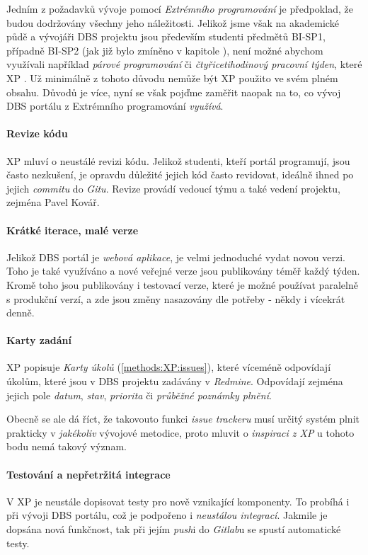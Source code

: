Jedním z požadavků vývoje pomocí \emph{Extrémního programování} je předpoklad, že budou dodržovány všechny jeho náležitosti. Jelikož jsme však na akademické půdě a vývojáři DBS projektu jsou především studenti předmětů BI-SP1, případně BI-SP2 (jak již bylo zmíněno v kapitole ), není možné abychom využívali například \emph{párové programování} či \emph{čtyřicetihodinový pracovní týden}, které XP .
Už minimálně z tohoto důvodu nemůže být XP použito ve svém plném obsahu. Důvodů je více, nyní se však pojďme zaměřit naopak na to, co vývoj DBS portálu z Extrémního programování \emph{využívá}.

\paragraph{Revize kódu}
XP mluví o neustálé revizi kódu. Jelikož studenti, kteří portál programují, jsou často nezkušení, je opravdu důležité jejich kód často revidovat, ideálně ihned po jejich \emph{commitu} do \emph{Gitu}. Revize provádí vedoucí týmu a také vedení projektu, zejména Pavel Kovář.

\paragraph{Krátké iterace, malé verze}
Jelikož DBS portál je \emph{webová aplikace}, je velmi jednoduché vydat novou verzi. Toho je také využíváno a nové veřejné verze jsou publikovány téměř každý týden. Kromě toho jsou publikovány i testovací verze, které je možné používat paralelně s produkční verzí, a zde jsou změny nasazovány dle potřeby - někdy i vícekrát denně.

\paragraph{Karty zadání}
XP popisuje \emph{Karty úkolů} (\ref{methods:XP:issues}), které víceméně odpovídají úkolům, které jsou v DBS projektu zadávány v \emph{Redmine}. Odpovídají zejména jejich pole \emph{datum}, \emph{stav}, \emph{priorita} či \emph{průběžné poznámky plnění}.

Obecně se ale dá říct, že takovouto funkci \emph{issue trackeru} musí určitý systém plnit prakticky v \emph{jakékoliv} vývojové metodice, proto mluvit o \emph{inspiraci z XP} u tohoto bodu nemá takový význam.

\paragraph{Testování a nepřetržitá integrace}
V XP je  neustále dopisovat testy pro nově vznikající komponenty. To probíhá i při vývoji DBS portálu, což je podpořeno i \emph{neustálou integrací}. Jakmile je dopsána nová funkčnost, tak při jejím \emph{push}i do \emph{Gitlab}u se spustí automatické testy.

